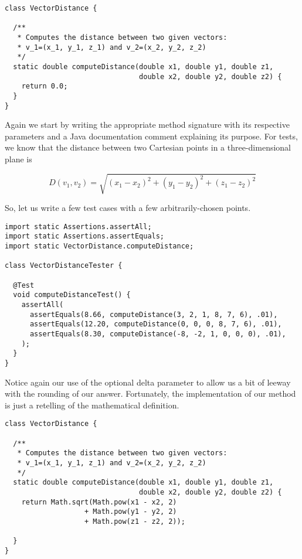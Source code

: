\begin{cl}{}
\begin{lstlisting}[language=MyJava]
class VectorDistance {

  /**
   * Computes the distance between two given vectors:
   * v_1=(x_1, y_1, z_1) and v_2=(x_2, y_2, z_2)
   */
  static double computeDistance(double x1, double y1, double z1, 
                                double x2, double y2, double z2) {
    return 0.0;
  }
}
\end{lstlisting}
\end{cl}

Again we start by writing the appropriate method signature with its respective parameters and a Java documentation comment explaining its purpose. For tests, we know that the distance between two Cartesian points in a three-dimensional plane is 

\[
D(v_1, v_2) = \sqrt{(x_1 - x_2)^2 + (y_1 - y_2)^2 + (z_1 - z_2)^2}
\]

So, let us write a few test cases with a few arbitrarily-chosen points.

\begin{cl}{}
\begin{lstlisting}[language=MyJava]
import static Assertions.assertAll;
import static Assertions.assertEquals;
import static VectorDistance.computeDistance;

class VectorDistanceTester {

  @Test
  void computeDistanceTest() {
    assertAll(
      assertEquals(8.66, computeDistance(3, 2, 1, 8, 7, 6), .01),
      assertEquals(12.20, computeDistance(0, 0, 0, 8, 7, 6), .01),
      assertEquals(8.30, computeDistance(-8, -2, 1, 0, 0, 0), .01),
    );
  }
}
\end{lstlisting}
\end{cl}
Notice again our use of the optional delta parameter to allow us a bit of leeway with the rounding of our answer. Fortunately, the implementation of our method is just a retelling of the mathematical definition.

\begin{cl}{}
\begin{lstlisting}[language=MyJava]
class VectorDistance {

  /**
   * Computes the distance between two given vectors:
   * v_1=(x_1, y_1, z_1) and v_2=(x_2, y_2, z_2)
   */
  static double computeDistance(double x1, double y1, double z1, 
                                double x2, double y2, double z2) {
    return Math.sqrt(Math.pow(x1 - x2, 2) 
                   + Math.pow(y1 - y2, 2)
                   + Math.pow(z1 - z2, 2));
  
  }
}
\end{lstlisting}
\end{cl}

